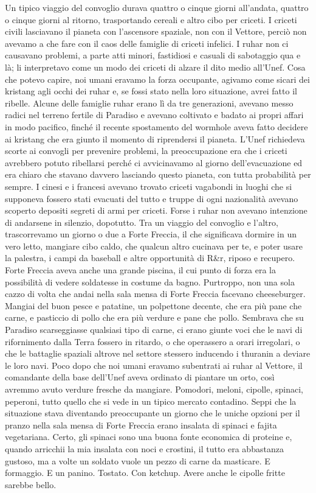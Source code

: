 Un tipico viaggio del convoglio durava quattro o cinque giorni
all'andata, quattro o cinque giorni al ritorno, trasportando cereali e
altro cibo per criceti. I criceti civili lasciavano il pianeta con
l'ascensore spaziale, non con il Vettore, perciò non avevamo a che fare
con il caos delle famiglie di criceti infelici. I ruhar non ci causavano
problemi, a parte atti minori, fastidiosi e casuali di sabotaggio qua e
là; li interpretavo come un modo dei criceti di alzare il dito medio
all'Unef. Cosa che potevo capire, noi umani eravamo la forza occupante,
agivamo come sicari dei kristang agli occhi dei ruhar e, se fossi stato
nella loro situazione, avrei fatto il ribelle. Alcune delle famiglie
ruhar erano lì da tre generazioni, avevano messo radici nel terreno
fertile di Paradiso e avevano coltivato e badato ai propri affari in
modo pacifico, finché il recente spostamento del wormhole aveva fatto
decidere ai kristang che era giunto il momento di riprendersi il
pianeta. L'Unef richiedeva scorte ai convogli per prevenire problemi, la
preoccupazione era che i criceti avrebbero potuto ribellarsi perché ci
avvicinavamo al giorno dell'evacuazione ed era chiaro che stavano
davvero lasciando questo pianeta, con tutta probabilità per sempre. I
cinesi e i francesi avevano trovato criceti vagabondi in luoghi che si
supponeva fossero stati evacuati del tutto e truppe di ogni nazionalità
avevano scoperto depositi segreti di armi per criceti. Forse i ruhar non
avevano intenzione di andarsene in silenzio, dopotutto. Tra un viaggio
del convoglio e l'altro, trascorrevamo un giorno o due a Forte Freccia,
il che significava dormire in un vero letto, mangiare cibo caldo, che
qualcun altro cucinava per te, e poter usare la palestra, i campi da
baseball e altre opportunità di R\&r, riposo e recupero. Forte Freccia
aveva anche una grande piscina, il cui punto di forza era la possibilità
di vedere soldatesse in costume da bagno. Purtroppo, non una sola cazzo
di volta che andai nella sala mensa di Forte Freccia facevano
cheeseburger. Mangiai del buon pesce e patatine, un polpettone decente,
che era più pane che carne, e pasticcio di pollo che era più verdure e
pane che pollo. Sembrava che su Paradiso scarseggiasse qualsiasi tipo di
carne, ci erano giunte voci che le navi di rifornimento dalla Terra
fossero in ritardo, o che operassero a orari irregolari, o che le
battaglie spaziali altrove nel settore stessero inducendo i thuranin a
deviare le loro navi. Poco dopo che noi umani eravamo subentrati ai
ruhar al Vettore, il comandante della base dell'Unef aveva ordinato di
piantare un orto, così avremmo avuto verdure fresche da mangiare.
Pomodori, meloni, cipolle, spinaci, peperoni, tutto quello che si vede
in un tipico mercato contadino. Seppi che la situazione stava diventando
preoccupante un giorno che le uniche opzioni per il pranzo nella sala
mensa di Forte Freccia erano insalata di spinaci e fajita vegetariana.
Certo, gli spinaci sono una buona fonte economica di proteine e, quando
arricchii la mia insalata con noci e crostini, il tutto era abbastanza
gustoso, ma a volte un soldato vuole un pezzo di carne da masticare. E
formaggio. E un panino. Tostato. Con ketchup. Avere anche le cipolle
fritte sarebbe bello.

